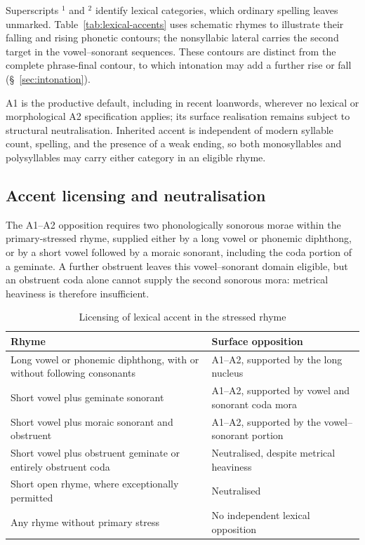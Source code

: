 Superscripts $^{1}$ and $^{2}$ identify lexical categories, which ordinary spelling leaves unmarked. Table~\ref{tab:lexical-accents} uses schematic rhymes to illustrate their falling and rising phonetic contours; the nonsyllabic lateral carries the second target in the vowel--sonorant sequences. These contours are distinct from the complete phrase-final contour, to which intonation may add a further rise or fall (\S~\ref{sec:intonation}).

A1 is the productive default, including in recent loanwords, wherever no lexical or morphological A2 specification applies; its surface realisation remains subject to structural neutralisation. Inherited accent is independent of modern syllable count, spelling, and the presence of a weak ending, so both monosyllables and polysyllables may carry either category in an eligible rhyme.

\subsection{Accent licensing and neutralisation}
\label{sec:accent-licensing}

The A1--A2 opposition requires two phonologically sonorous morae within the primary-stressed rhyme, supplied either by a long vowel or phonemic diphthong, or by a short vowel followed by a moraic sonorant, including the coda portion of a geminate. A further obstruent leaves this vowel--sonorant domain eligible, but an obstruent coda alone cannot supply the second sonorous mora: metrical heaviness is therefore insufficient.

\begin{table}[!ht]
    \caption{Licensing of lexical accent in the stressed rhyme}
    \label{tab:accent-licensing}
    \begin{tabularx}{\textwidth}{X X}
        \toprule
        \rowcolor{grammarTableHead}
        \textbf{Rhyme} & \textbf{Surface opposition} \\
        \midrule
        Long vowel or phonemic diphthong, with or without following consonants & A1--A2, supported by the long nucleus \\
        Short vowel plus geminate sonorant & A1--A2, supported by vowel and sonorant coda mora \\
        Short vowel plus moraic sonorant and obstruent & A1--A2, supported by the vowel--sonorant portion \\
        Short vowel plus obstruent geminate or entirely obstruent coda & Neutralised, despite metrical heaviness \\
        Short open rhyme, where exceptionally permitted & Neutralised \\
        Any rhyme without primary stress & No independent lexical opposition \\
        \bottomrule
    \end{tabularx}
\end{table}


